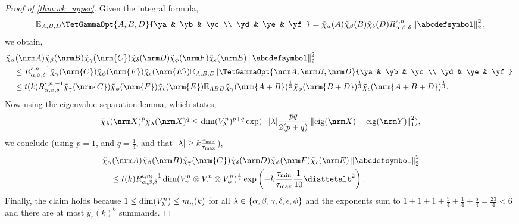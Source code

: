 \documentclass[notitlepage, 10pt]{article}
\begin{document}
\begin{proof}[Proof of \cref{thm:wk_upper}]
    Given the integral formula,
    \begin{equation}
        \mathbb E_{A,B,D}\TetGammaOpt{A,B,D}{\ya & \yb & \yc \\ \yd & \ye & \yf} = \tilde \chi_{\ya}(A)\tilde \chi_{\yb}(B)\tilde \chi_{\yd}(D) R^{\ye,n}_{\ya,\yb,\yd}\norm{\abcdefsymbol}_2^2,
    \end{equation}
    we obtain,
    \begin{align}
        &\tilde \chi_{\ya}(\nrm A)\tilde \chi_{\yb}(\nrm B)\tilde \chi_{\yc}(\nrm{C})\tilde \chi_{\yd}(\nrm D)\tilde \chi_{\yf}(\nrm F)\tilde \chi_{\ye}(\nrm E)\norm{\abcdefsymbol}_2^2 \\
        &\quad \leq R^{\ye,n;-1}_{\ya,\yb,\yd} \tilde \chi_{\yc}(\nrm{C})\tilde \chi_{\yf}(\nrm{F})\tilde \chi_{\ye}(\nrm{E}) \mathbb E_{A,B,D} \abs{\TetGammaOpt{\nrm A,\nrm B,\nrm D}{\ya & \yb & \yc \\ \yd & \ye & \yf}} \\
        &\quad \leq t(k)R^{\ye,n;-1}_{\ya,\yb,\yd}\tilde \chi_{\yc}(\nrm{C})\tilde \chi_{\yf}(\nrm{F})\tilde \chi_{\ye}(\nrm{E}) \mathbb E_{ABD} \tilde \chi_{\yc}(\nrm{A+B})^{\frac{1}{3}}\tilde \chi_{\yf}(\nrm{B+D})^{\frac{1}{3}}\tilde \chi_{\ye}(\nrm{A+B+D})^{\frac{1}{3}}.
    \end{align}
    Now using the eigenvalue separation lemma, which states,
    \begin{equation}
        \tilde \chi_{\yx}(\nrm X)^p\tilde \chi_{\yx}(\nrm X)^q \leq \dim(V_{\yx}^n)^{p+q} \exp(-{\syx}\frac{pq}{2(p+q)} \norm{\eig(\nrm X)-\eig(\nrm Y)}^{2}_1),
    \end{equation}
    we conclude (using $p=1$, and $q=\frac{1}{4}$, and that ${|\lambda|} \geq k \frac{\tau_{\min}}{\tau_{\max}}$),
    \begin{align}
        &\tilde \chi_{\ya}(\nrm A)\tilde \chi_{\yb}(\nrm B)\tilde \chi_{\yc}(\nrm{C})\tilde \chi_{\yd}(\nrm D)\tilde \chi_{\yf}(\nrm F)\tilde \chi_{\ye}(\nrm E)\norm{\abcdefsymbol}_2^2 \\
        &\quad\leq t(k)R^{\ye,n;-1}_{\ya,\yb,\yd}\dim(V_{\yc}^{n}\ot V_{\ye}^{n} \ot V_{\yf}^{n})^{\frac{5}{4}} \exp\left(-k\frac{\tau_{\min}}{\tau_{\max}} \frac{1}{10}\disttetalt^2\right).
    \end{align}
    Finally, the claim holds because $1 \leq \dim(V_{\lambda}^{n}) \leq m_n(k)$ for all $\lambda \in \{\alpha,\beta,\gamma,\delta,\epsilon,\phi\}$ and the exponents sum to $1+1+1+\frac{5}{4}+\frac{1}{4}+\frac{5}{4} = \frac{23}{4} < 6$ and there are at most $y_{r}(k)^6$ summands.
\end{proof}
\end{document}
